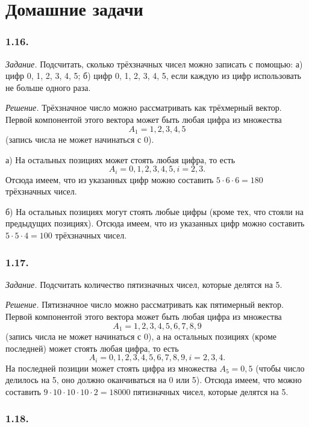 \documentclass{book}
\begin{document}
\section*{Домашние задачи}

\subsubsection*{1.16.}

\textit{Задание.} Подсчитать, сколько трёхзначных чисел можно записать с помощью: а) цифр 0, 1, 2, 3, 4, 5; б) цифр 0, 1, 2, 3, 4, 5, если каждую из цифр использовать не больше одного раза.

\textit{Решение.} Трёхзначное число можно рассматривать как трёхмерный вектор. Первой компонентой этого вектора может быть любая цифра из множества $$A_1={1, 2, 3, 4, 5}$$ (запись числа не может начинаться с 0).

а) На остальных позициях может стоять любая цифра, то есть $$A_i={0, 1, 2, 3, 4, 5}, i=2, 3.$$ Отсюда имеем, что из указанных цифр можно составить $5\cdot 6\cdot 6=180$ трёхзначных чисел.

б) На остальных позициях могут стоять любые цифры (кроме тех, что стояли на предыдущих позициях). Отсюда имеем, что из указанных цифр можно составить $5\cdot 5\cdot 4=100$ трёхзначных чисел.

\subsubsection*{1.17.}

\textit{Задание.} Подсчитать количество пятизначных чисел, которые делятся на 5.

\textit{Решение.} Пятизначное число можно рассматривать как пятимерный вектор. Первой компонентой этого вектора может быть любая цифра из множества $$A_1={1, 2, 3, 4, 5, 6, 7, 8, 9}$$ (запись числа не может начинаться с 0), а на остальных позициях (кроме последней) может стоять любая цифра, то есть $$A_i={0, 1, 2, 3, 4, 5, 6, 7, 8, 9}, i=2, 3, 4.$$ На последней позиции может стоять цифра из множества $A_5={0, 5}$ (чтобы число делилось на 5, оно должно оканчиваться на 0 или 5). Отсюда имеем, что можно составить $9\cdot 10\cdot 10\cdot 10\cdot 2=18000$ пятизначных чисел, которые делятся на 5.

\subsubsection*{1.18.}
\end{document}
